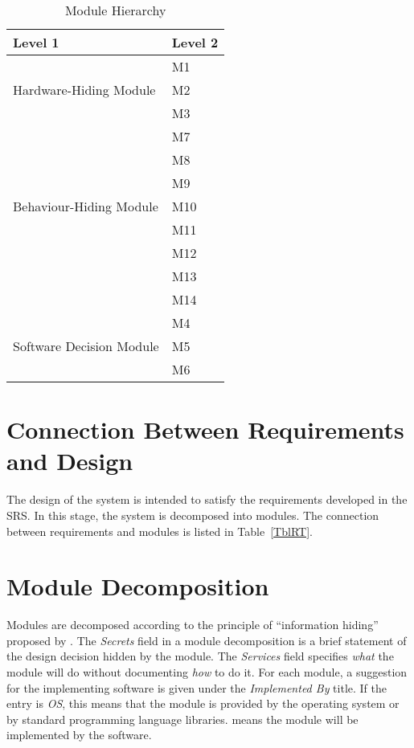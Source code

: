 \documentclass[12pt, titlepage]{article}
\begin{document}
\begin{table}[h!]
\centering
\begin{tabular}{p{} p{}}
\toprule
\textbf{Level 1} & \textbf{Level 2}\\
\midrule

\multirow{3}{0.3\textwidth}{Hardware-Hiding Module} & M1\\
& M2\\
& M3\\
\midrule

\multirow{7}{0.3\textwidth}{Behaviour-Hiding Module} & M7\\
& M8\\
& M9\\
& M10\\
& M11\\
& M12\\
& M13\\ 
& M14\\
\midrule

\multirow{3}{0.3\textwidth}{Software Decision Module} & {M4}\\
& M5\\
& M6\\
\bottomrule

\end{tabular}
\caption{Module Hierarchy}
\label{TblMH}
\end{table}

\section{Connection Between Requirements and Design} \label{SecConnection}

The design of the system is intended to satisfy the requirements developed in
the SRS. In this stage, the system is decomposed into modules. The connection
between requirements and modules is listed in Table~\ref{TblRT}.

\section{Module Decomposition} \label{SecMD}

Modules are decomposed according to the principle of ``information hiding''
proposed by \citet{ParnasEtAl1984}. The \emph{Secrets} field in a module
decomposition is a brief statement of the design decision hidden by the
module. The \emph{Services} field specifies \emph{what} the module will do
without documenting \emph{how} to do it. For each module, a suggestion for the
implementing software is given under the \emph{Implemented By} title. If the
entry is \emph{OS}, this means that the module is provided by the operating
system or by standard programming language libraries.  \emph{\progname{}} means the
module will be implemented by the \progname{} software.
\end{document}
